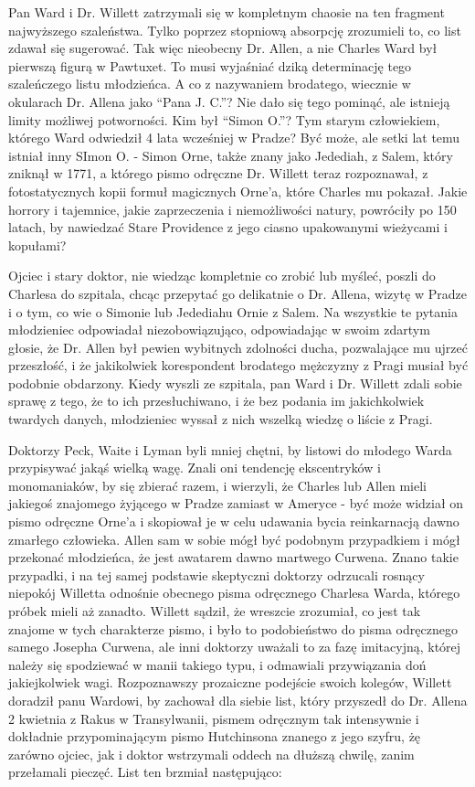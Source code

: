Pan Ward i Dr. Willett zatrzymali się w kompletnym chaosie na ten fragment najwyższego szaleństwa. Tylko poprzez stopniową absorpcję zrozumieli to, co list zdawał się sugerować. Tak więc nieobecny Dr. Allen, a nie Charles Ward był pierwszą figurą w Pawtuxet. To musi wyjaśniać dziką determinację tego szaleńczego listu młodzieńca. A co z nazywaniem brodatego, wiecznie w okularach Dr. Allena jako ``Pana J. C.''? Nie dało się tego pominąć, ale istnieją limity możliwej potworności. Kim był ``Simon O.''? Tym starym człowiekiem, którego Ward odwiedził 4 lata wcześniej w Pradze? Być może, ale setki lat temu istniał inny SImon O. - Simon Orne, także znany jako Jedediah, z Salem, który zniknął w 1771, a którego pismo odręczne Dr. Willett teraz rozpoznawał, z fotostatycznych kopii formuł magicznych Orne'a, które Charles mu pokazał. Jakie horrory i tajemnice, jakie zaprzeczenia i niemożliwości natury, powróciły po 150 latach, by nawiedzać Stare Providence z jego ciasno upakowanymi wieżycami i kopułami?

Ojciec i stary doktor, nie wiedząc kompletnie co zrobić lub myśleć, poszli do Charlesa do szpitala, chcąc przepytać go delikatnie o Dr. Allena, wizytę w Pradze i o tym, co wie o Simonie lub Jedediahu Ornie z Salem. Na wszystkie te pytania młodzieniec odpowiadał niezobowiązująco, odpowiadając w swoim zdartym głosie, że Dr. Allen był pewien wybitnych zdolności ducha, pozwalające mu ujrzeć przeszłość, i że jakikolwiek korespondent brodatego mężczyzny z Pragi musiał być podobnie obdarzony. Kiedy wyszli ze szpitala, pan Ward i Dr. Willett zdali sobie sprawę z tego, że to ich przesłuchiwano, i że bez podania im jakichkolwiek twardych danych, młodzieniec wyssał z nich wszelką wiedzę o liście z Pragi.

Doktorzy Peck, Waite i Lyman byli mniej chętni, by listowi do młodego Warda przypisywać jakąś wielką wagę. Znali oni tendencję ekscentryków i monomaniaków, by się zbierać razem, i wierzyli, że Charles lub Allen mieli jakiegoś znajomego żyjącego w Pradze zamiast w Ameryce - być może widział on pismo odręczne Orne'a i skopiował je w celu udawania bycia reinkarnacją dawno zmarłego człowieka. Allen sam w sobie mógł być podobnym przypadkiem i mógł przekonać młodzieńca, że jest awatarem dawno martwego Curwena. Znano takie przypadki, i na tej samej podstawie skeptyczni doktorzy odrzucali rosnący niepokój Willetta odnośnie obecnego pisma odręcznego Charlesa Warda, którego próbek mieli aż zanadto. Willett sądził, że wreszcie zrozumiał, co jest tak znajome w tych charakterze pismo, i było to podobieństwo do pisma odręcznego samego Josepha Curwena, ale inni doktorzy uważali to za fazę imitacyjną, której należy się spodziewać w manii takiego typu, i odmawiali przywiązania doń jakiejkolwiek wagi. Rozpoznawszy prozaiczne podejście swoich kolegów, Willett doradził panu Wardowi, by zachował dla siebie list, który przyszedł do Dr. Allena 2 kwietnia z Rakus w Transylwanii, pismem odręcznym tak intensywnie i dokładnie przypominającym pismo Hutchinsona znanego z jego szyfru, żę zarówno ojciec, jak i doktor wstrzymali oddech na dłuższą chwilę, zanim przełamali pieczęć. List ten brzmiał następująco:  

